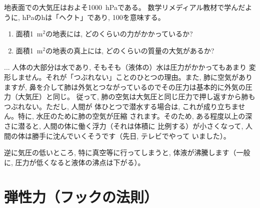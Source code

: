 \begin{q}\label{q:pressure} 地表面での大気圧はおよそ1000~hPaである。
数学リメディアル教材で学んだように, hPaのhは「ヘクト」であり, 100を意味する。
\begin{enumerate}
\item 面積1~m$^2$の地表には, どのくらいの力がかかっているか?
\item 面積1~m$^2$の地表の真上には, どのくらいの質量の大気があるか?
\end{enumerate}
\end{q}

\begin{faq}{\small{}
... 人体の大部分は水であり, そもそも（液体の）水は圧力がかかってもあまり
変形しません。それが「つぶれない」ことのひとつの理由。また, 肺に空気がありますが, 
鼻を介して肺は外気とつながっているのでその圧力は基本的に外気の圧力（大気圧）と同じ。
従って, 肺の空気は大気圧と同じ圧力で押し返すから肺もつぶれない。ただし, 人間が
体ひとつで潜水する場合は, これが成り立ちません。特に, 水圧のために肺の空気が圧縮
されます。そのため, ある程度以上の深さに潜ると, 人間の体に働く浮力（それは体積に
比例する）が小さくなって, 人間の体は勝手に沈んでいくそうです（先日, テレビでやって
いました）。

逆に気圧の低いところ, 特に真空等に行ってしまうと, 体液が沸騰します（一般に, 
圧力が低くなると液体の沸点は下がる）。}\end{faq}
\mv


\section{弾性力（フックの法則）}


